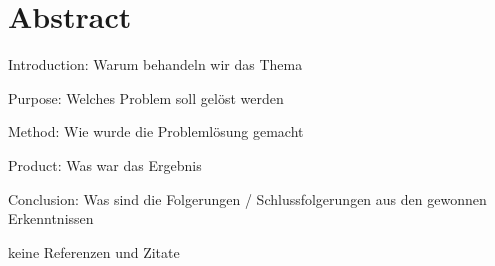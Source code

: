 


\chapter*{Abstract}
\label{ch:abstract}

Introduction: Warum behandeln wir das Thema

Purpose: Welches Problem soll gelöst werden

Method: Wie wurde die Problemlösung gemacht

Product: Was war das Ergebnis

Conclusion: Was sind die Folgerungen / Schlussfolgerungen aus den gewonnen Erkenntnissen

keine Referenzen und Zitate

